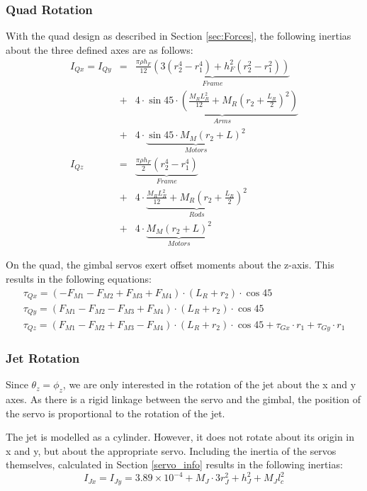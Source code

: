 \documentclass[11pt]{article}
\begin{document}
\subsubsection{Quad Rotation}
With the quad design as described in Section \ref{sec:Forces}, the following inertias about the three defined axes are as follows:
\begin{eqnarray}
    I_{Qx} = I_{Qy} & = & \underbrace{\frac{\pi \rho h_F}{12}(3(r_2^4-r_1^4) + h_F^2(r_2^2-r_1^2))}_{Frame} \nonumber \\ & + & 4 \cdot \underbrace{\sin 45 \cdot (\frac{M_R L_R^2}{12}+M_R(r_2+\frac{L_R}{2})^2)}_{Arms} \nonumber \\ & + & 4 \cdot \underbrace{\sin 45 \cdot M_M(r_2+L)^2}_{Motors} \\
    I_{Qz} & = & \underbrace{\frac{\pi \rho h_F}{2}(r_2^4-r_1^4)}_{Frame} \nonumber \\ & + & 4 \cdot \underbrace{\frac{M_RL_R^2}{12} + M_R(r_2+\frac{L_R}{2})^2}_{Rods} \nonumber \\ & + & 4 \cdot \underbrace{M_M(r_2+L)^2}_{Motors}
\end{eqnarray}

On the quad, the gimbal servos exert offset moments about the z-axis. This results in the following equations:
\begin{eqnarray}
    \tau_{Qx} = (-F_{M1} - F_{M2} + F_{M3} + F_{M4})\cdot(L_R + r_2)\cdot \cos{45} \\
    \tau_{Qy} = (F_{M1} - F_{M2} - F_{M3} + F_{M4})\cdot(L_R + r_2)\cdot \cos{45} \\
    \tau_{Qz} = (F_{M1} - F_{M2} + F_{M3} - F_{M4})\cdot(L_R + r_2)\cdot \cos{45} + \tau_{Gx}\cdot r_1 + \tau_{Gy}\cdot r_1
\end{eqnarray}

\subsubsection{Jet Rotation}
Since $\theta_z = \phi_z$, we are only interested in the rotation of the jet about the x and y axes. As there is a rigid linkage between the servo and the gimbal, the position of the servo is proportional to the rotation of the jet.

The jet is modelled as a cylinder. However, it does not rotate about its origin in x and y, but about the appropriate servo. Including the inertia of the servos themselves, calculated in Section \ref{servo_info} results in the following inertias:
\begin{equation}
    I_{Jx} = I_{Jy} = 3.89\times10^{-4} + M_J\cdot3r_J^2 + h_J^2 + M_Jl_c^2
\end{equation}
\end{document}

